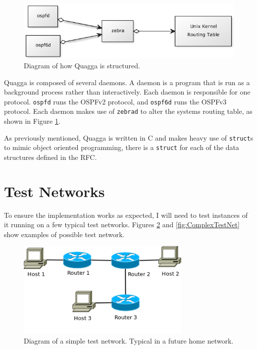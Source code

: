 \documentclass[12pt]{report}
\begin{document}
\begin{figure}
\centering
\includegraphics[width=\textwidth]{../Diagrams/UML/quaggaZebra.png}
\caption{Diagram of how Quagga is structured.}
\label{fig:QuaggaStructure}
\end{figure}

Quagga is composed of several daemons. A daemon is a program that is run as
a background process rather than interactively. Each daemon is
responsible for one protocol. \texttt{ospfd} runs the OSPFv2 protocol, and
\texttt{ospf6d} runs the OSPFv3 protocol. Each daemon makes use of 
\texttt{zebrad} to alter the systems routing table, as shown in Figure
\ref{fig:QuaggaStructure}. 

As previously mentioned, Quagga is written in C and makes heavy use of
\texttt{struct}s to mimic object oriented programming, there is a
\texttt{struct} for each of the data structures defined in the RFC. \ 

\section{Test Networks}
To ensure the implementation works as expected, I will need to test instances of it
running on a few typical test networks. Figures \ref{fig:SimpleTestNet} and
\ref{fig:ComplexTestNet} show examples of possible test network.

\begin{figure}
\centering
\includegraphics[width=0.75\textwidth]{../Diagrams/Network/SimpleTestNet.png}
\caption{Diagram of a simple test network. Typical in a future home network.}
\label{fig:SimpleTestNet}
\end{figure}
\end{document}
